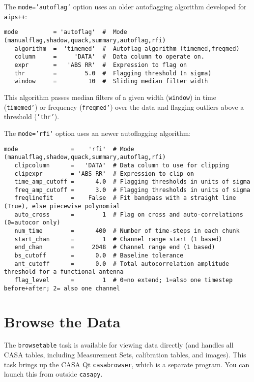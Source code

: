 The {\tt mode='autoflag'} option uses an older autoflagging algorithm
developed for {\tt aips++}:
\small
\begin{verbatim}
mode          = 'autoflag'  #  Mode (manualflag,shadow,quack,summary,autoflag,rfi)
   algorithm  =  'timemed'  #  Autoflag algorithm (timemed,freqmed)
   column     =     'DATA'  #  Data column to operate on.
   expr       =   'ABS RR'  #  Expression to flag on
   thr        =        5.0  #  Flagging threshold (n sigma)
   window     =         10  #  Sliding median filter width
\end{verbatim}
\normalsize
This algorithm passes median filters of a given width ({\tt window})
in time ({\tt timemed'}) or frequency ({\tt freqmed'}) over the data
and flagging outliers above a threshold ({\tt 'thr'}).

The {\tt mode='rfi'} option uses an newer autoflagging algorithm:
\small
\begin{verbatim}
mode               =    'rfi'  # Mode (manualflag,shadow,quack,summary,autoflag,rfi)
   clipcolumn      =   'DATA'  # Data column to use for clipping
   clipexpr        = 'ABS RR'  # Expression to clip on
   time_amp_cutoff =      4.0  # Flagging thresholds in units of sigma
   freq_amp_cutoff =      3.0  # Flagging thresholds in units of sigma
   freqlinefit     =    False  # Fit bandpass with a straight line (True), else piecewise polynomial
   auto_cross      =        1  # Flag on cross and auto-correlations (0=autocor only)
   num_time        =      400  # Number of time-steps in each chunk
   start_chan      =        1  # Channel range start (1 based)
   end_chan        =     2048  # Channel range end (1 based)
   bs_cutoff       =      0.0  # Baseline tolerance
   ant_cutoff      =      0.0  # Total autocorrelation amplitude threshold for a functional antenna
   flag_level      =        1  # 0=no extend; 1=also one timestep before+after; 2= also one channel
\end{verbatim}
\normalsize


\section{Browse the Data}
\label{section:edit.browse}

The {\tt browsetable} task is available for viewing data directly
(and handles all CASA tables, including Measurement Sets, calibration tables,
and images). This task brings up the CASA Qt
{\tt casabrowser}, which is a separate program.  You can launch this
from outside {\tt casapy}.  

